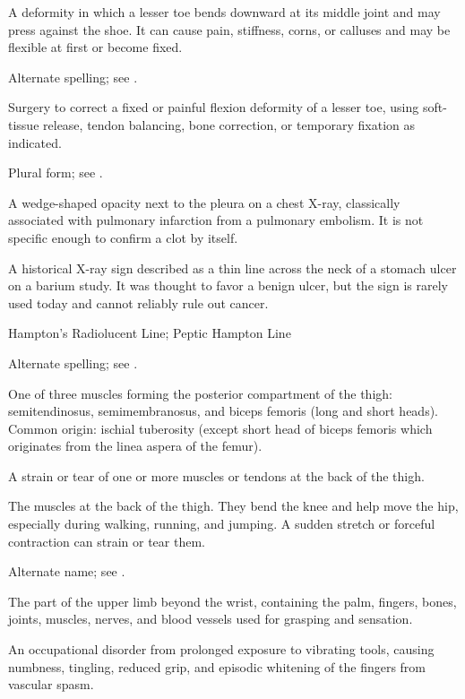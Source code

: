  A deformity in which a lesser toe bends downward at its middle joint and may press against the shoe. It can cause pain, stiffness, corns, or calluses and may be flexible at first or become fixed.

 Alternate spelling; see .

 Surgery to correct a fixed or painful flexion deformity of a lesser toe, using soft-tissue release, tendon balancing, bone correction, or temporary fixation as indicated.

 Plural form; see .

 A wedge-shaped opacity next to the pleura on a chest X-ray, classically associated with pulmonary infarction from a pulmonary embolism. It is not specific enough to confirm a clot by itself.

 A historical X-ray sign described as a thin line across the neck of a stomach ulcer on a barium study. It was thought to favor a benign ulcer, but the sign is rarely used today and cannot reliably rule out cancer.

\synonyms
Hampton's Radiolucent Line; Peptic Hampton Line

 Alternate spelling; see .

 One of three muscles forming the posterior compartment of the thigh: semitendinosus,
semimembranosus, and biceps femoris (long and short heads). Common origin: ischial
tuberosity (except short head of biceps femoris which originates from the linea aspera
of the femur).

 A strain or tear of one or more muscles or tendons at the back of the thigh.

 The muscles at the back of the thigh. They bend the knee and help move the hip, especially during walking, running, and jumping. A sudden stretch or forceful contraction can strain or tear them.

 Alternate name; see .

 The part of the upper limb beyond the wrist, containing the palm, fingers, bones, joints, muscles, nerves, and blood vessels used for grasping and sensation.

 An occupational disorder from prolonged exposure to vibrating tools, causing numbness, tingling, reduced grip, and episodic whitening of the fingers from vascular spasm.

